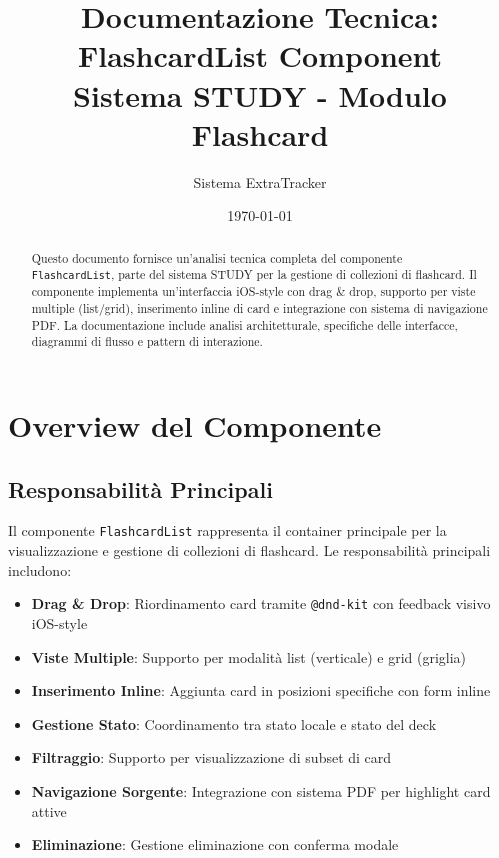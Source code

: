 \documentclass[11pt,a4paper]{article}
\title{
    \textbf{Documentazione Tecnica: FlashcardList Component} \\
    \large Sistema STUDY - Modulo Flashcard
}
\author{Sistema ExtraTracker}
\date{\today}
\begin{document}
\maketitle

\begin{abstract}
Questo documento fornisce un'analisi tecnica completa del componente \texttt{FlashcardList}, parte del sistema STUDY per la gestione di collezioni di flashcard. Il componente implementa un'interfaccia iOS-style con drag \& drop, supporto per viste multiple (list/grid), inserimento inline di card e integrazione con sistema di navigazione PDF. La documentazione include analisi architetturale, specifiche delle interfacce, diagrammi di flusso e pattern di interazione.
\end{abstract}

\tableofcontents
\newpage


\section{Overview del Componente}

\subsection{Responsabilità Principali}

Il componente \texttt{FlashcardList} rappresenta il container principale per la visualizzazione e gestione di collezioni di flashcard. Le responsabilità principali includono:

\begin{itemize}
    \item \textbf{Drag \& Drop}: Riordinamento card tramite \texttt{@dnd-kit} con feedback visivo iOS-style
    \item \textbf{Viste Multiple}: Supporto per modalità list (verticale) e grid (griglia)
    \item \textbf{Inserimento Inline}: Aggiunta card in posizioni specifiche con form inline
    \item \textbf{Gestione Stato}: Coordinamento tra stato locale e stato del deck
    \item \textbf{Filtraggio}: Supporto per visualizzazione di subset di card
    \item \textbf{Navigazione Sorgente}: Integrazione con sistema PDF per highlight card attive
    \item \textbf{Eliminazione}: Gestione eliminazione con conferma modale
\end{itemize}
\end{document}
